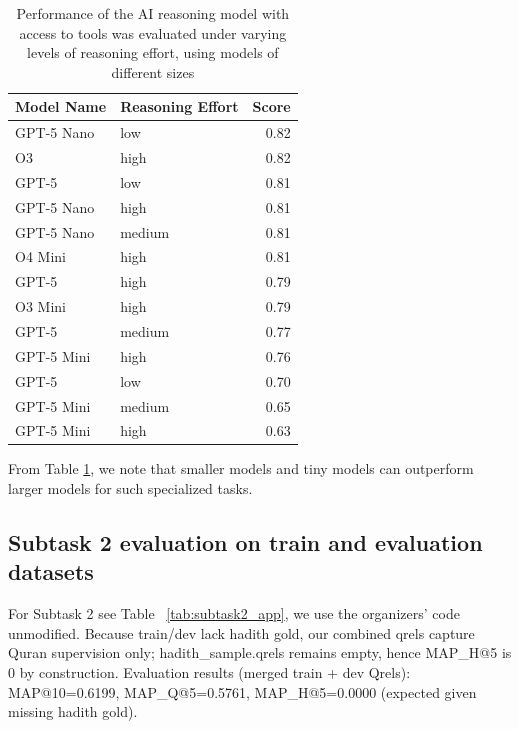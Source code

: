 \documentclass[11pt]{article}
\begin{document}
\begin{table}[H]
    \centering
    \begin{tabular}{llr}
    \hline
 \textbf{Model Name} & \textbf{Reasoning Effort} & \textbf{Score} \\ \hline
    GPT-5 Nano & low & 0.82 \\ 
    O3 & high & 0.82 \\ 
    GPT-5 & low & 0.81 \\ 
    GPT-5 Nano & high & 0.81 \\ 
    GPT-5 Nano & medium & 0.81 \\ 
    O4 Mini & high & 0.81 \\ 
    GPT-5 & high & 0.79 \\ 
    O3 Mini & high & 0.79 \\
    GPT-5 & medium & 0.77 \\ 
    GPT-5 Mini & high & 0.76 \\ 
    GPT-5 & low & 0.70 \\ 
    GPT-5 Mini & medium & 0.65 \\ 
    GPT-5 Mini & high & 0.63 \\ \hline
    \end{tabular}
    \caption{Performance of the AI reasoning model with access to tools was evaluated under varying levels of reasoning effort, using models of different sizes}
    \label{tab:model_performance}
\end{table}
From Table \ref{tab:model_performance}, we note that smaller models and tiny models can outperform larger models for such specialized tasks.

\subsection{Subtask 2 evaluation on train and evaluation datasets}
For Subtask 2 see Table ~\ref{tab:subtask2_app}, we use the organizers’ code unmodified. Because train/dev lack hadith gold, our combined qrels capture Quran supervision only; hadith\_sample.qrels remains empty, hence MAP\_H@5 is 0 by construction. 
Evaluation results (merged train + dev Qrels): MAP@10=0.6199, MAP\_Q@5=0.5761, MAP\_H@5=0.0000 (expected given missing hadith gold).
\begin{table}[H]
  \caption{\label{tab:subtask2_app}
    Subtask 2 evaluation results. 
  }
\end{table}
\end{document}

